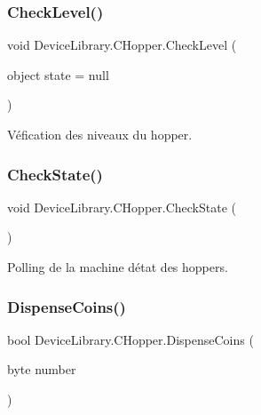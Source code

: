 \subsubsection{\texorpdfstring{Check\+Level()}{CheckLevel()}}
{\footnotesize\ttfamily void Device\+Library.\+C\+Hopper.\+Check\+Level (\begin{DoxyParamCaption}\item[{object}]{state = {\ttfamily null} }\end{DoxyParamCaption})\hspace{0.3cm}{\ttfamily [inline]}}



Véfication des niveaux du hopper. 

\mbox{\label{class_device_library_1_1_c_hopper_a43760bb1d6cac2e875eb6ddb7615a90a}} 
\subsubsection{\texorpdfstring{Check\+State()}{CheckState()}}
{\footnotesize\ttfamily void Device\+Library.\+C\+Hopper.\+Check\+State (\begin{DoxyParamCaption}{ }\end{DoxyParamCaption})\hspace{0.3cm}{\ttfamily [inline]}}



Polling de la machine d\textquotesingle{}état des hoppers. 

\mbox{\label{class_device_library_1_1_c_hopper_adc0fd478490e3ef5e255f7bc2f64f506}} 
\subsubsection{\texorpdfstring{Dispense\+Coins()}{DispenseCoins()}}
{\footnotesize\ttfamily bool Device\+Library.\+C\+Hopper.\+Dispense\+Coins (\begin{DoxyParamCaption}\item[{byte}]{number }\end{DoxyParamCaption})\hspace{0.3cm}{\ttfamily [inline]}}



